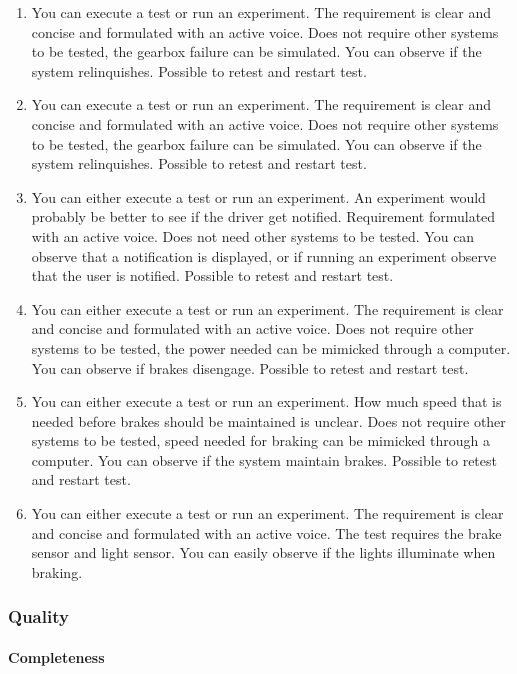 \begin{enumerate}
    \item{You can execute a test or run an experiment. The requirement is clear and concise and formulated with an active voice. Does not require other systems to be tested, the gearbox failure can be simulated. You can observe if the system relinquishes. Possible to retest and restart test.}
    \item{You can execute a test or run an experiment. The requirement is clear and concise and formulated with an active voice. Does not require other systems to be tested, the gearbox failure can be simulated. You can observe if the system relinquishes. Possible to retest and restart test.}

    \item{You can either execute a test or run an experiment. An experiment would probably be better to see if the driver get notified. Requirement formulated with an active voice. Does not need other systems to be tested. You can observe that a notification is displayed, or if running an experiment observe that the user is notified. Possible to retest and restart test.}

    \item{You can either execute a test or run an experiment. The requirement is clear and concise and formulated with an active voice. Does not require other systems to be tested, the power needed can be mimicked through a computer. You can observe if brakes disengage. Possible to retest and restart test.}
    \item{You can either execute a test or run an experiment. How much speed that is needed before brakes should be maintained is unclear. Does not require other systems to be tested, speed needed for braking can be mimicked through a computer. You can observe if the system maintain brakes. Possible to retest and restart test.}
    \item{You can either execute a test or run an experiment. The requirement is clear and concise and formulated with an active voice. The test requires the brake sensor and light sensor. You can easily observe if the lights illuminate when braking.}
\end{enumerate}

\subsubsection{Quality}

\paragraph{Completeness}

